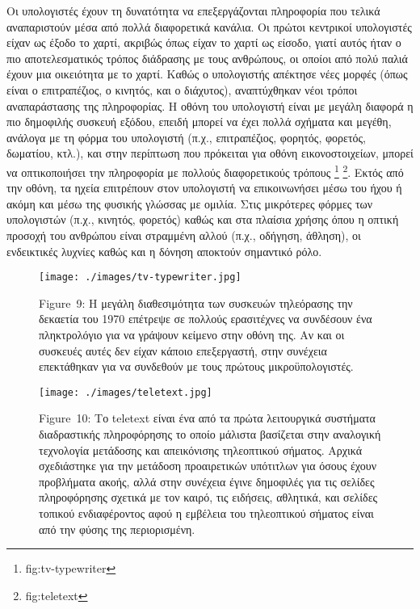 \documentclass[
]{article}
\begin{document}
Οι υπολογιστές έχουν τη δυνατότητα να επεξεργάζονται πληροφορία που
τελικά αναπαριστούν μέσα από πολλά διαφορετικά κανάλια. Οι πρώτοι
κεντρικοί υπολογιστές είχαν ως έξοδο το χαρτί, ακριβώς όπως είχαν το
χαρτί ως είσοδο, γιατί αυτός ήταν ο πιο αποτελεσματικός τρόπος διάδρασης
με τους ανθρώπους, οι οποίοι από πολύ παλιά έχουν μια οικειότητα με το
χαρτί. Καθώς ο υπολογιστής απέκτησε νέες μορφές (όπως είναι ο
επιτραπέζιος, ο κινητός, και ο διάχυτος), αναπτύχθηκαν νέοι τρόποι
αναπαράστασης της πληροφορίας. Η οθόνη του υπολογιστή είναι με μεγάλη
διαφορά η πιο δημοφιλής συσκευή εξόδου, επειδή μπορεί να έχει πολλά
σχήματα και μεγέθη, ανάλογα με τη φόρμα του υπολογιστή (π.χ.,
επιτραπέζιος, φορητός, φορετός, δωματίου, κτλ.), και στην περίπτωση που
πρόκειται για οθόνη εικονοστοιχείων, μπορεί να οπτικοποιήσει την
πληροφορία με πολλούς διαφορετικούς τρόπους \footnote{fig:tv-typewriter}
\footnote{fig:teletext}. Εκτός από την οθόνη, τα ηχεία επιτρέπουν στον
υπολογιστή να επικοινωνήσει μέσω του ήχου ή ακόμη και μέσω της φυσικής
γλώσσας με ομιλία. Στις μικρότερες φόρμες των υπολογιστών (π.χ.,
κινητός, φορετός) καθώς και στα πλαίσια χρήσης όπου η οπτική προσοχή του
ανθρώπου είναι στραμμένη αλλού (π.χ., οδήγηση, άθληση), οι ενδεικτικές
λυχνίες καθώς και η δόνηση αποκτούν σημαντικό ρόλο.

\leavevmode{}%
\begin{figure}
\hypertarget{fig:tv-typewriter}{%
\centering
\texttt{[image: ./images/tv-typewriter.jpg]}
\caption{Figure~9: Η μεγάλη διαθεσιμότητα των συσκευών τηλεόρασης την
δεκαετία του 1970 επέτρεψε σε πολλούς ερασιτέχνες να συνδέσουν ένα
πληκτρολόγιο για να γράψουν κείμενο στην οθόνη της. Αν και οι συσκευές
αυτές δεν είχαν κάποιο επεξεργαστή, στην συνέχεια επεκτάθηκαν για να
συνδεθούν με τους πρώτους μικροϋπολογιστές.}\label{fig:tv-typewriter}
}
\end{figure}

\leavevmode{}%
\begin{figure}
\hypertarget{fig:teletext}{%
\centering
\texttt{[image: ./images/teletext.jpg]}
\caption{Figure~10: Το teletext είναι ένα από τα πρώτα λειτουργικά
συστήματα διαδραστικής πληροφόρησης το οποίο μάλιστα βασίζεται στην
αναλογική τεχνολογία μετάδοσης και απεικόνισης τηλεοπτικού σήματος.
Αρχικά σχεδιάστηκε για την μετάδοση προαιρετικών υπότιτλων για όσους
έχουν προβλήματα ακοής, αλλά στην συνέχεια έγινε δημοφιλές για τις
σελίδες πληροφόρησης σχετικά με τον καιρό, τις ειδήσεις, αθλητικά, και
σελίδες τοπικού ενδιαφέροντος αφού η εμβέλεια του τηλεοπτικού σήματος
είναι από την φύσης της περιορισμένη.}\label{fig:teletext}
}
\end{figure}
\end{document}
